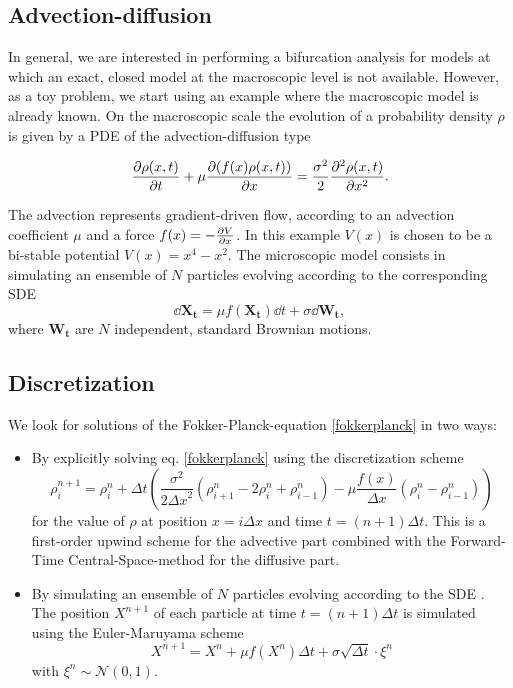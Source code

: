

\subsection{Advection-diffusion}

In general, we are interested in performing a bifurcation analysis for  models at which an exact, closed model at the macroscopic level is not available. However, as a toy problem, we start using an example where the macroscopic model is already known. On the macroscopic scale the evolution of a probability density $\rho$ is given by a PDE of the advection-diffusion type

\begin{equation} 
\label{fokkerplanck}
\frac{\partial \rho(x,t)}{\partial t} + \mu \frac{\partial (f(x) \rho(x,t))}{\partial x} = \frac{\sigma^2}{2}  \frac{\partial^2 \rho(x,t)}{\partial x^2} .
\end{equation}

The advection represents gradient-driven flow, according to an advection coefficient $\mu$ and a force $f(x) = - \frac{\partial V}{\partial x}$. In this example $V(x)$ is chosen to be a bi-stable potential $V(x) = x^4-x^2$. 
The microscopic model consists in simulating an ensemble of $N$ particles evolving according to the corresponding SDE
\begin{equation} 
\label{SDE}
     \dd \mathbf{X_t} = \mu f(\mathbf{X_t}) \dd t + \sigma \dd{\mathbf{W_t}},
\end{equation}
where $\mathbf{W_t}$ are $N$ independent, standard Brownian motions.



\subsection{Discretization}

We look for solutions of the Fokker-Planck-equation \eqref{fokkerplanck}
in two ways:
\begin{itemize}
\item By explicitly solving eq. \eqref{fokkerplanck} using the discretization scheme
\begin{equation} 
\label{pde_discretization}
\rho_i^{n+1} = \rho_i^n + \Delta t \left( \frac{\sigma^2}{2{\Delta x}^2} \left( \rho_{i+1}^{n} - 2 \rho_i^n + \rho_{i-1}^n \right)  - \mu \frac{f(x)}{\Delta x} (\rho_i^n - \rho_{i-1}^n) \right)
\end{equation}
for the value  of $\rho$ at position $x=i \Delta x$ and time $t=(n+1) \Delta t$. This is a first-order upwind scheme for the advective part combined with the Forward-Time Central-Space-method for the diffusive part.


\item By simulating an ensemble of $N$ particles evolving according to the SDE \label{SDE}.  The position $X^{n+1}$ of each  particle  at time $t= (n+1) \Delta t$ is simulated using the Euler-Maruyama scheme
\begin{equation}
   X^{n + 1} = X^{n} + \mu f(X^n) \Delta t +  \sigma \sqrt{\Delta t}\cdot \xi^n \label{Euler-Mar}
\end{equation}
with $\xi^n  \sim \mathcal{N} (0,1)$.
\end{itemize}

